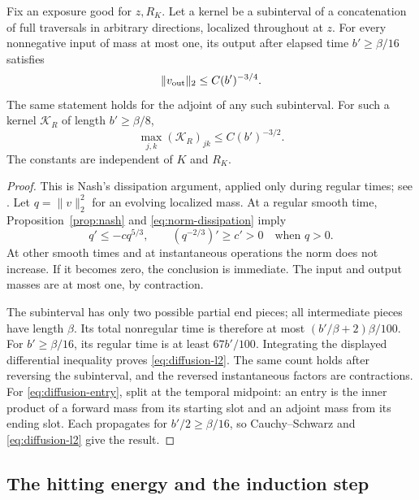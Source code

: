 \begin{proposition}\label{prop:diffusion}
Fix an exposure good for \(z,R_K\).  Let a kernel be a subinterval
of a concatenation of full traversals in arbitrary directions,
localized throughout at \(z\).  For every nonnegative input of
mass at most one, its output after elapsed time \(b'\ge\beta/16\)
satisfies
\begin{equation}\label{eq:diffusion-l2}
 \|v_{\rm out}\|_2\le C(b')^{-3/4}.
\end{equation}
The same statement holds for the adjoint of any such subinterval.
For such a kernel \(\mathcal K_R\) of length \(b'\ge\beta/8\),
\begin{equation}\label{eq:diffusion-entry}
 \max_{j,k}(\mathcal K_R)_{jk}\le C(b')^{-3/2}.
\end{equation}
The constants are independent of \(K\) and \(R_K\).
\end{proposition}

\begin{proof}
This is Nash's dissipation argument, applied only during regular
times; see \cite[pp.~935--936]{Nash1958}.  Let
\(q=\|v\|_2^2\) for an evolving localized mass.  At a regular
smooth time, Proposition~\ref{prop:nash} and
\eqref{eq:norm-dissipation} imply
\[
 q'\le-cq^{5/3},\qquad (q^{-2/3})'\ge c'>0
 \quad\text{when }q>0.
\]
At other smooth times and at instantaneous operations the norm
does not increase.  If it becomes zero, the conclusion is immediate.
The input and output masses are at most one, by contraction.

The subinterval has only two possible partial end pieces; all
intermediate pieces have length \(\beta\).  Its total nonregular
time is therefore at most \((b'/\beta+2)\beta/100\).  For
\(b'\ge\beta/16\), its regular time is at least \(67b'/100\).
Integrating the displayed differential inequality proves
\eqref{eq:diffusion-l2}.  The same count holds after reversing the
subinterval, and the reversed instantaneous factors are contractions.
For \eqref{eq:diffusion-entry}, split at the temporal midpoint:
an entry is the inner product of a forward mass from its starting
slot and an adjoint mass from its ending slot.  Each propagates
for \(b'/2\ge\beta/16\), so Cauchy--Schwarz and
\eqref{eq:diffusion-l2} give the result.
\end{proof}

\subsection{The hitting energy and the induction step}

